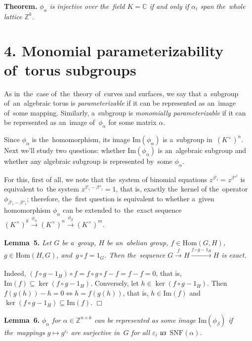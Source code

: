 \documentclass[twoside]{article}
\begin{document}
\medskip\noindent\textbf{Theorem.}\emph{
    $\phi_\alpha$ is injective over the~field $K = \mathbb{C}$ if and only if $\alpha_i$ span the~whole lattice $\mathbb{Z}^k$.
}

\section*{4. Monomial parameterizability of~torus subgroups}

As in~the~case of~the~theory of~curves and surfaces, we say that a~subgroup of~an~algebraic torus
is \textit{parameterizable} if it can be represented as an~image of~some mapping. Similarly, a~subgroup
is \textit{monomially parameterizable} if it can be represented as an~image of~$\phi_\alpha$ for some matrix $\alpha$.

Since $\phi_\alpha$ is the~homomorphism, its image $\mathrm{Im}(\phi_\alpha)$ is a~subgroup in~$(K^\times)^n$.
Next we'll study two questions: whether $\mathrm{Im}(\phi_\alpha)$ is an~algebraic subgroup and whether
any algebraic subgroup is represented by~some $\phi_\alpha$.

For this, first of all, we note that the~system of binomial equations $z^{\beta'_i} = z^{\beta''^i}$ is equivalent
to~the system $z^{\beta'_i - \beta''_i} = 1$, that is, exactly the~kernel of the~operator $\phi_{\beta'_i - \beta''_i}$;
therefore, the~first question is equivalent to whether a~given homomorphism $\phi_\alpha$ can be extended
to~the~exact sequence $(K^\times)^k \xrightarrow[]{\phi_\alpha} (K^\times)^n \xrightarrow[]{\phi_\beta} (K^\times)^m$.

\medskip\noindent\textbf{Lemma~5.}\emph{
    Let $G$ be a~group, $H$ be an~abelian group, $f \in \mathrm{Hom}(G, H)$, $g \in \mathrm{Hom}(H, G)$, and~$g \circ f = 1_G$.
    Then the~sequence $G \xrightarrow[]{f} H \xrightarrow[]{f \circ g - 1_H} H$ is exact.
}\medskip

    Indeed, $(f \circ g - 1_H) \circ f = f \circ g \circ f - f = f - f = 0$, that is, $\mathrm{Im}(f) \subseteq \ker(f \circ g - 1_H)$.
    Conversely, let $h \in \ker(f \circ g - 1_H)$. Then $f(g(h)) - h = 0 \Leftrightarrow h = f(g(h))$, that is, $h \in \mathrm{Im}(f)$
    and $\ker(f \circ g - 1_H) \subseteq \mathrm{Im}(f)$.
\hfill$\Box$\medskip

\medskip\noindent\textbf{Lemma~6.}\emph{
    $\phi_\alpha$ for $\alpha \in \mathbb{Z}^{n \times k}$ can be represented as some image $\mathrm{Im}(\phi_\beta)$
    if the~mappings $g \mapsto g^{\varepsilon_i}$ are surjective in~$G$ for all $\varepsilon_i$ из~$\mathrm{SNF}(\alpha)$.
}\medskip
\end{document}
